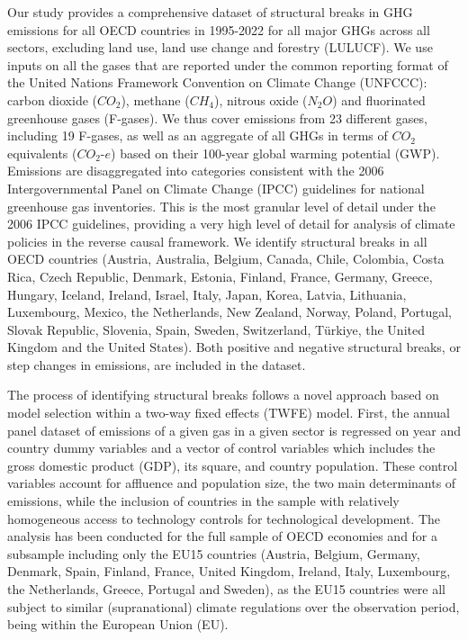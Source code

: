 \documentclass[a4paper]{article}
\begin{document}
Our study provides a comprehensive dataset of structural breaks in GHG emissions for all OECD countries in 1995-2022 for all major GHGs across all sectors, excluding land use, land use change and forestry (LULUCF). We use inputs on all the gases that are reported under the common reporting format of the United Nations Framework Convention on Climate Change (UNFCCC): carbon dioxide ($CO_2$), methane ($CH_4$), nitrous oxide ($N_2O$) and fluorinated greenhouse gases (F-gases). \cite{eggleston20062006} We thus cover emissions from 23 different gases, including 19 F-gases, as well as an aggregate of all GHGs in terms of $CO_2$ equivalents ($CO_2$-$e$) based on their 100-year global warming potential (GWP). Emissions are disaggregated into categories consistent with the 2006 Intergovernmental Panel on Climate Change (IPCC) guidelines for national greenhouse gas inventories. \cite{eggleston20062006} This is the most granular level of detail under the 2006 IPCC guidelines, providing a very high level of detail for analysis of climate policies in the reverse causal framework. We identify structural breaks in all OECD countries (Austria, Australia, Belgium, Canada, Chile, Colombia, Costa Rica, Czech Republic, Denmark, Estonia, Finland, France, Germany, Greece, Hungary, Iceland, Ireland, Israel, Italy, Japan, Korea, Latvia, Lithuania, Luxembourg, Mexico, the Netherlands, New Zealand, Norway, Poland, Portugal, Slovak Republic, Slovenia, Spain, Sweden, Switzerland, Türkiye, the United Kingdom and the United States). Both positive and negative structural breaks, or step changes in emissions, are included in the dataset.

The process of identifying structural breaks follows a novel approach based on model selection within a two-way fixed effects (TWFE) model. \cite{koch2022attributing} First, the annual panel dataset of emissions of a given gas in a given sector is regressed on year and country dummy variables and a vector of control variables which includes the gross domestic product (GDP), its square, and country population. These control variables account for affluence and population size, the two main determinants of emissions, \cite{hamilton2002determinants} while the inclusion of countries in the sample with relatively homogeneous access to technology controls for technological development. The analysis has been conducted for the full sample of OECD economies and for a subsample including only the EU15 countries (Austria, Belgium, Germany, Denmark, Spain, Finland, France, United Kingdom, Ireland, Italy, Luxembourg, the Netherlands, Greece, Portugal and Sweden), as the EU15 countries were all subject to similar (supranational) climate regulations over the observation period, being within the European Union (EU).
\end{document}
